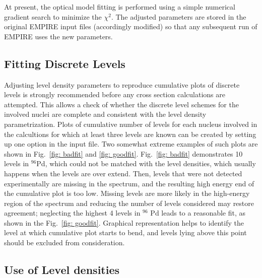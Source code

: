 At present, the optical model fitting is performed using a simple numerical
gradient search to minimize the $\chi^{2}$. The adjusted parameters are
stored in the original EMPIRE input files (accordingly modified) so that any
subsequent run of EMPIRE uses the new parameters.

\subsection{Fitting Discrete Levels}

Adjusting level density parameters to reproduce cumulative plots of discrete
levels is strongly recommended before any cross section calculations are
attempted. This allows a check of whether the discrete level schemes for the
involved nuclei are complete and consistent with the level density
parametrization. Plots of cumulative number of levels for each nucleus
involved in the calcultions for which at least three levels are known can be
created by setting up one option in the input file. Two somewhat extreme
examples of such plots are shown in Fig.~\ref{fig: badfit} and \ref{fig:
goodfit}. Fig.~\ref{fig: badfit} demonstrates 10 levels in $^{96}$Pd, which
could not be matched with the level densities, which usually happens when
the levels are over extend. Then, levels that were not detected
experimentally are missing in the spectrum, and the resulting high energy
end of the cumulative plot is too low. Missing levels are more likely in the
high-energy region of the spectrum and reducing the number of levels
considered may restore agreement; neglecting the highest 4 levels in $^{96}$%
Pd leads to a reasonable fit, as shown in the Fig.~\ref{fig: goodfit}.
Graphical representation helps to identify the level at which cumulative
plot starts to bend, and levels lying above this point should be excluded
from consideration.

\subsection{Use of Level densities}

